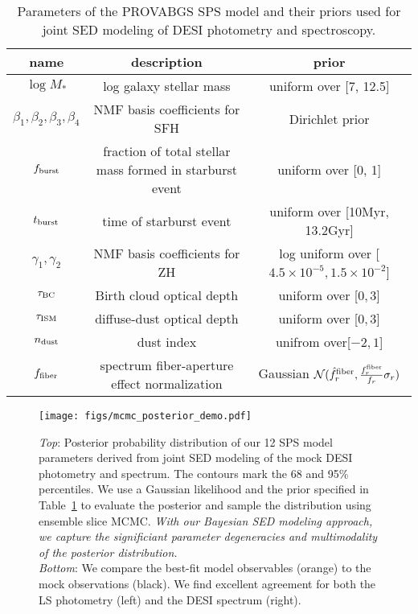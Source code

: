 \begin{table} 
\caption{Parameters of the PROVABGS SPS model and their priors used for joint
    SED modeling of DESI photometry and spectroscopy.} 
\begin{center}
    \begin{tabular}{ccc} \toprule
        name & description & prior \\[3pt]
        \hline 
        $\log M_*$                              & log galaxy stellar mass & uniform over [7, 12.5] \\
        $\beta_1, \beta_2, \beta_3, \beta_4$    & NMF basis coefficients for SFH & Dirichlet prior \\
        $f_{\rm burst}$ & fraction of total stellar mass formed in starburst event & uniform over [0, 1] \\
        $t_{\rm burst}$ & time of starburst event & uniform over [10Myr, 13.2Gyr] \\
        $\gamma_1, \gamma_2$ & NMF basis coefficients for ZH & log uniform over
        [$4.5\times10^{-5}, 1.5\times10^{-2}$] \\
        $\tau_{\rm BC}$ & Birth cloud optical depth & uniform over [$0, 3$] \\
        $\tau_{\rm ISM}$ & diffuse-dust optical depth & uniform over [$0, 3$] \\
        $n_{\rm dust}$ & \cite{calzetti2001} dust index & unifrom over[$-2, 1$]\\
        $f_{\rm fiber}$ & spectrum fiber-aperture effect normalization &
        Gaussian $\mathcal{N}(\hat{f}^{\rm fiber}_r, \frac{f^{\rm fiber}_r}{f_r} \sigma_r)$\\
        \hline            
\end{tabular} \label{tab:params}
\end{center}
\end{table}

\begin{figure}
\begin{center}
    \texttt{[image: figs/mcmc\_posterior\_demo.pdf]}
    \caption{
        \emph{Top}: 
        Posterior probability distribution of our 12 SPS model parameters
        derived from joint SED modeling of the mock DESI photometry and
        spectrum.
        The contours mark the 68 and 95\% percentiles.
        We use a Gaussian likelihood and the prior specified in
        Table~\ref{tab:params} to evaluate the posterior and sample the
        distribution using ensemble slice MCMC. 
        \emph{With our Bayesian SED modeling approach, we capture the significiant
        parameter degeneracies and multimodality of the posterior
        distribution.}\\
        \emph{Bottom}: 
        We compare the best-fit model observables (orange) to the mock
        observations (black).  
        We find excellent agreement for both the LS photometry (left) and the
        DESI spectrum (right). 
    } \label{fig:posterior}
\end{center}
\end{figure}


